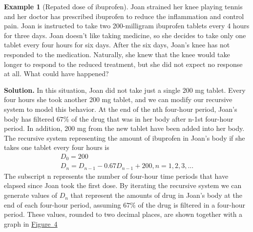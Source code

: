 \documentclass[10pt,]{book}
\theoremstyle{plain}
\theoremstyle{definition}
\theoremstyle{definition}
\newtheorem{example}[theorem]{Example}
\theoremstyle{definition}
\numberwithin{equation}{section}
\newlength{\panelmax}
\begin{document}
\begin{example}[Repated dose of ibuprofen]\label{example-2}
\hypertarget{p-16}{}%
Joan strained her knee playing tennis and her doctor has prescribed ibuprofen to reduce the inflammation and control pain.  Joan is instructed to take two 200-milligram ibuprofen tablets every 4 hours for three days.  Joan doesn’t like taking medicine, so she decides to take only one tablet every four hours for six days.  After the six days, Joan’s knee has not responded to the medication.  Naturally, she knew that the knee would take longer to respond to the reduced treatment, but she did not expect no response at all.  What could have happened?%
\par\smallskip%
\noindent\textbf{Solution.}\hypertarget{solution-2}{}\quad%
\hypertarget{p-17}{}%
In this situation, Joan did not take just a single 200 mg tablet.  Every four hours she took another 200 mg tablet, and we can modify our recursive system to model this behavior. At the end of the nth four-hour period, Joan’s body has filtered \(67\%\) of the drug that was in her body after n-1st  four-hour period.  In addition, 200 mg from the new tablet have been added into her body.  The recursive system representing the amount of ibuprofen in Joan’s body if she takes one tablet every four hours is%
%
\begin{gather*}
D_0=200\\
D_n=D_{n-1} - 0.67D_{n-1} + 200, n=1,2,3,...
\end{gather*}
\hypertarget{p-18}{}%
The subscript n represents the number of four-hour time periods that have elapsed since Joan took the first dose.  By iterating the recursive system we can generate values of \(D_n\) that represent the amounts of drug in Joan’s body at the end of each four-hour period, assuming  \(67\%\) of the drug is filtered in a four-hour period.  These values, rounded to two decimal places, are shown together with a graph in \hyperref[figure-ibuprofen-multi-dose]{Figure~4}%
\begin{figure}
\centering
{%
\setlength{\panelmax}{0pt}
\ifdefined\panelboxAimage\else\newsavebox{\panelboxAimage}\fi%
\begin{lrbox}{\panelboxAimage}
\resizebox{0.2\linewidth}{!}{{
\pgfplotstabletypeset[
col sep=comma,
column type=l,
every head row/.style={after row=\hline},
every column/.style={column type/.add={|}{|}},
every first column/.style={column type/.add={}{|}},
}}
\end{lrbox}}
\end{figure}
\end{example}
\end{document}

